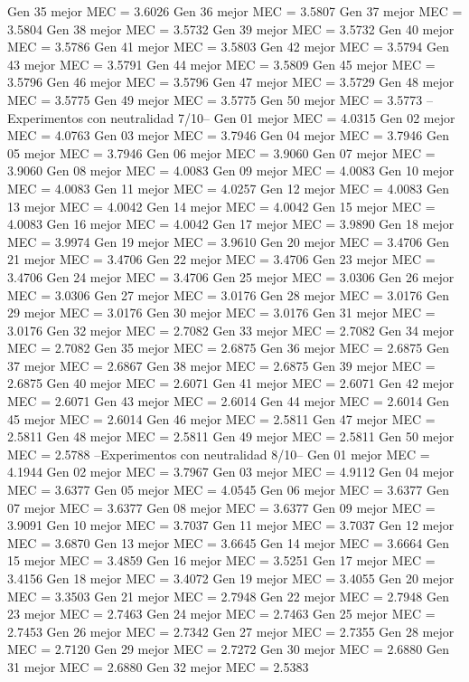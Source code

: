 Gen 35 mejor MEC = 3.6026
Gen 36 mejor MEC = 3.5807
Gen 37 mejor MEC = 3.5804
Gen 38 mejor MEC = 3.5732
Gen 39 mejor MEC = 3.5732
Gen 40 mejor MEC = 3.5786
Gen 41 mejor MEC = 3.5803
Gen 42 mejor MEC = 3.5794
Gen 43 mejor MEC = 3.5791
Gen 44 mejor MEC = 3.5809
Gen 45 mejor MEC = 3.5796
Gen 46 mejor MEC = 3.5796
Gen 47 mejor MEC = 3.5729
Gen 48 mejor MEC = 3.5775
Gen 49 mejor MEC = 3.5775
Gen 50 mejor MEC = 3.5773
--Experimentos con neutralidad 7/10--
Gen 01 mejor MEC = 4.0315
Gen 02 mejor MEC = 4.0763
Gen 03 mejor MEC = 3.7946
Gen 04 mejor MEC = 3.7946
Gen 05 mejor MEC = 3.7946
Gen 06 mejor MEC = 3.9060
Gen 07 mejor MEC = 3.9060
Gen 08 mejor MEC = 4.0083
Gen 09 mejor MEC = 4.0083
Gen 10 mejor MEC = 4.0083
Gen 11 mejor MEC = 4.0257
Gen 12 mejor MEC = 4.0083
Gen 13 mejor MEC = 4.0042
Gen 14 mejor MEC = 4.0042
Gen 15 mejor MEC = 4.0083
Gen 16 mejor MEC = 4.0042
Gen 17 mejor MEC = 3.9890
Gen 18 mejor MEC = 3.9974
Gen 19 mejor MEC = 3.9610
Gen 20 mejor MEC = 3.4706
Gen 21 mejor MEC = 3.4706
Gen 22 mejor MEC = 3.4706
Gen 23 mejor MEC = 3.4706
Gen 24 mejor MEC = 3.4706
Gen 25 mejor MEC = 3.0306
Gen 26 mejor MEC = 3.0306
Gen 27 mejor MEC = 3.0176
Gen 28 mejor MEC = 3.0176
Gen 29 mejor MEC = 3.0176
Gen 30 mejor MEC = 3.0176
Gen 31 mejor MEC = 3.0176
Gen 32 mejor MEC = 2.7082
Gen 33 mejor MEC = 2.7082
Gen 34 mejor MEC = 2.7082
Gen 35 mejor MEC = 2.6875
Gen 36 mejor MEC = 2.6875
Gen 37 mejor MEC = 2.6867
Gen 38 mejor MEC = 2.6875
Gen 39 mejor MEC = 2.6875
Gen 40 mejor MEC = 2.6071
Gen 41 mejor MEC = 2.6071
Gen 42 mejor MEC = 2.6071
Gen 43 mejor MEC = 2.6014
Gen 44 mejor MEC = 2.6014
Gen 45 mejor MEC = 2.6014
Gen 46 mejor MEC = 2.5811
Gen 47 mejor MEC = 2.5811
Gen 48 mejor MEC = 2.5811
Gen 49 mejor MEC = 2.5811
Gen 50 mejor MEC = 2.5788
--Experimentos con neutralidad 8/10--
Gen 01 mejor MEC = 4.1944
Gen 02 mejor MEC = 3.7967
Gen 03 mejor MEC = 4.9112
Gen 04 mejor MEC = 3.6377
Gen 05 mejor MEC = 4.0545
Gen 06 mejor MEC = 3.6377
Gen 07 mejor MEC = 3.6377
Gen 08 mejor MEC = 3.6377
Gen 09 mejor MEC = 3.9091
Gen 10 mejor MEC = 3.7037
Gen 11 mejor MEC = 3.7037
Gen 12 mejor MEC = 3.6870
Gen 13 mejor MEC = 3.6645
Gen 14 mejor MEC = 3.6664
Gen 15 mejor MEC = 3.4859
Gen 16 mejor MEC = 3.5251
Gen 17 mejor MEC = 3.4156
Gen 18 mejor MEC = 3.4072
Gen 19 mejor MEC = 3.4055
Gen 20 mejor MEC = 3.3503
Gen 21 mejor MEC = 2.7948
Gen 22 mejor MEC = 2.7948
Gen 23 mejor MEC = 2.7463
Gen 24 mejor MEC = 2.7463
Gen 25 mejor MEC = 2.7453
Gen 26 mejor MEC = 2.7342
Gen 27 mejor MEC = 2.7355
Gen 28 mejor MEC = 2.7120
Gen 29 mejor MEC = 2.7272
Gen 30 mejor MEC = 2.6880
Gen 31 mejor MEC = 2.6880
Gen 32 mejor MEC = 2.5383
